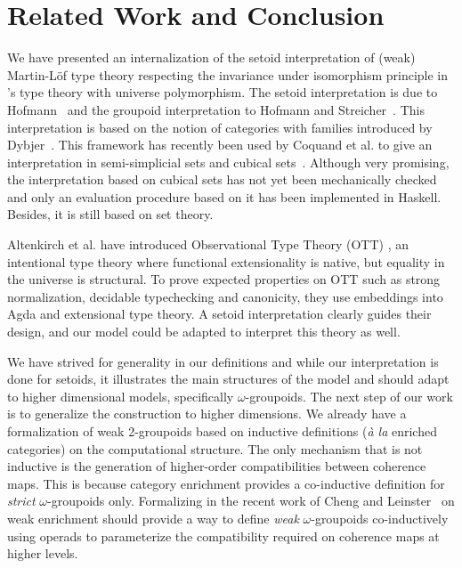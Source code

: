 
\section{Related Work and Conclusion}
\label{sec:conclusion}

We have presented an internalization of the setoid interpretation of
(weak) Martin-Löf type theory respecting the invariance under
isomorphism principle in \Coq's type theory with universe polymorphism.
%
The setoid interpretation is due to Hofmann~\cite{hofmann95These} and the groupoid
interpretation to Hofmann and Streicher~\cite{groupoid-interp}. This
interpretation is based on the notion of categories with families
introduced by Dybjer~\cite{dybjer:internaltt}.
%
This framework has recently been used by Coquand et al. to give an
interpretation in semi-simplicial sets and cubical
sets~\cite{barras:_gener_takeut_gandy_inter,coquand:cubical}.
%
Although very promising, the interpretation based on cubical sets has not
yet been mechanically checked and only an evaluation procedure based on
it has been implemented in Haskell. Besides, it is still based on set theory.

Altenkirch et al. have introduced Observational Type Theory (OTT)
\cite{altenkirch-mcbride-wierstra:ott-now}, an intentional type theory where
functional extensionality is native, but equality in the universe is structural.
%
To prove expected properties on OTT such as strong normalization,
decidable typechecking and canonicity, they use embeddings into Agda and
extensional type theory. A setoid interpretation clearly guides their
design, and our model could be adapted to interpret this theory as well.

We have strived for generality in our definitions and while our
interpretation is done for setoids, it illustrates the main structures
of the model and should adapt to higher dimensional models, specifically
$\omega$-groupoids.
%
The next step of our work is to generalize the construction to higher
dimensions. We already have a formalization of weak 2-groupoids based
on inductive definitions (\emph{à la} enriched categories) on the
computational structure.
%
The only mechanism that is not inductive is the generation of
higher-order compatibilities between coherence maps. 
%
This is because category enrichment provides a co-inductive definition
for \emph{strict} $\omega$-groupoids only. Formalizing in \Coq the recent work
of Cheng and Leinster~\cite{cheng2012weak} on weak enrichment should
provide a way to define \emph{weak} $\omega$-groupoids co-inductively using
operads to parameterize the compatibility required on coherence maps at
higher levels.
  

